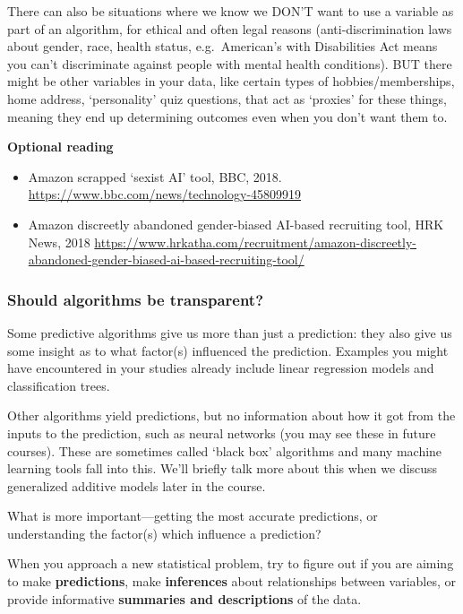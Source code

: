 \documentclass[
  openany]{book}
\providecommand{\tightlist}{%
  \setlength{\itemsep}{0pt}\setlength{\parskip}{0pt}}
\begin{document}
There can also be situations where we know we DON'T want to use a variable as part of an algorithm, for ethical and often legal reasons (anti-discrimination laws about gender, race, health status, e.g.~American's with Disabilities Act means you can't discriminate against people with mental health conditions). BUT there might be other variables in your data, like certain types of hobbies/memberships, home address, `personality' quiz questions, that act as `proxies' for these things, meaning they end up determining outcomes even when you don't want them to.

\textbf{Optional reading}

\begin{itemize}
\tightlist
\item
  Amazon scrapped `sexist AI' tool, BBC, 2018. \url{https://www.bbc.com/news/technology-45809919}\\
\item
  Amazon discreetly abandoned gender-biased AI-based recruiting tool, HRK News, 2018 \url{https://www.hrkatha.com/recruitment/amazon-discreetly-abandoned-gender-biased-ai-based-recruiting-tool/}
\end{itemize}

\hypertarget{should-algorithms-be-transparent}{%
\subsubsection{Should algorithms be transparent?}\label{should-algorithms-be-transparent}}

Some predictive algorithms give us more than just a prediction: they also give us some
insight as to what factor(s) influenced the prediction. Examples you might have encountered in your studies already include linear regression models and classification trees.

Other algorithms yield predictions, but no information about how it got from the inputs
to the prediction, such as neural networks (you may see these in future courses). These are sometimes called `black box' algorithms and many machine learning tools fall into this. We'll briefly talk more about this when we discuss generalized additive models later in the course.

What is more important---getting the most accurate predictions, or understanding the factor(s) which influence a prediction?

When you approach a new statistical problem, try to figure out if you are aiming to make \textbf{predictions}, make \textbf{inferences} about relationships between variables, or provide informative \textbf{summaries and descriptions} of the data.
\end{document}
